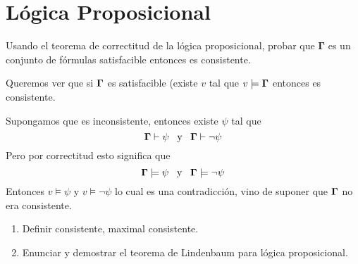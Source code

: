 \documentclass[leqno, 12pt, twoside,letterpaper]{book}
\begin{document}
\chapter{Lógica Proposicional}

\begin{ej}{5}
    Usando el teorema de correctitud de la lógica proposicional, probar que
    $\bm{\Gamma}$ es un conjunto de fórmulas satisfacible entonces es
    consistente.
\end{ej}

\begin{solucion}
Queremos ver que si $\bm{\Gamma}$ es satisfacible (existe $v$ tal que $v \models \bm{\Gamma}$ entonces es consistente.
\begin{dem}
Supongamos que es inconsistente, entonces existe $\psi$ tal que
\[ \bm{\Gamma} \vdash \psi  \mbox { \, y \, } \bm{\Gamma} \vdash \lnot\psi \]
Pero por correctitud esto significa que
\[ \bm{\Gamma} \models \psi \mbox { \, y \, } \bm{\Gamma} \models \lnot\psi \]
Entonces $v \models \psi$ y $v \models \lnot\psi$ lo cual es una contradicción, vino de suponer que $\bm{\Gamma}$ no era consistente.
\end{dem}
\end{solucion}

\begin{ej}{4}
    \begin{enumerate}
    \item Definir consistente, maximal consistente.
    \item Enunciar y demostrar el teorema de Lindenbaum para lógica proposicional.
    \end{enumerate}
\end{ej}
\end{document}

